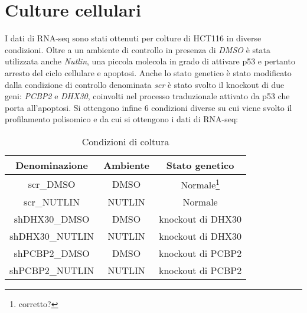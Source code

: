 \section{Culture cellulari}
I dati di RNA-seq sono stati ottenuti per colture di HCT116 in diverse condizioni.
Oltre a un ambiente di controllo in presenza di \emph{DMSO} \`e stata utilizzata anche \emph{Nutlin}, una piccola molecola in grado di attivare p53 e pertanto arresto del ciclo cellulare e apoptosi.
Anche lo stato genetico \`e stato modificato dalla condizione di controllo denominata \emph{scr} \`e stato svolto il knockout di due geni: \emph{PCBP2} e \emph{DHX30}, coinvolti nel processo traduzionale attivato da p53 che porta all'apoptosi.
Si ottengono infine $6$ condizioni diverse su cui viene svolto il profilamento polisomico e da cui si ottengono i dati di RNA-seq:
\begin{table}[H]
  \begin{tabular}{|c|c|c|}
    \hline
    Denominazione & Ambiente & Stato genetico\\
    \hline
    scr\_DMSO & DMSO & Normale\footnote{corretto?}\\
    \hline
    scr\_NUTLIN & NUTLIN & Normale\\
    \hline
    shDHX30\_DMSO & DMSO & knockout di DHX30\\
    \hline
    shDHX30\_NUTLIN & NUTLIN & knockout di DHX30\\
    \hline
    shPCBP2\_DMSO & DMSO & knockout di PCBP2\\
    \hline
    shPCBP2\_NUTLIN & NUTLIN & knockout di PCBP2\\
    \hline
  \end{tabular}
  \centering
  \caption{Condizioni di coltura}
\end{table}

